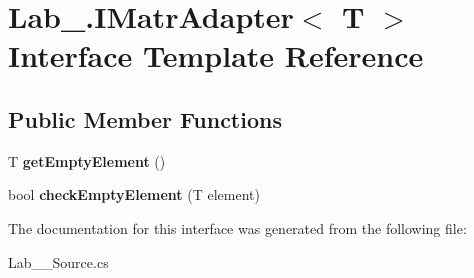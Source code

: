 \hypertarget{interface_lab__3_1_1_i_matr_adapter}{}\section{Lab\+\_.\+I\+Matr\+Adapter$<$ T $>$ Interface Template Reference}
\label{interface_lab__3_1_1_i_matr_adapter}
\subsection*{Public Member Functions}
\begin{DoxyCompactItemize}
\item 
\mbox{\label{interface_lab__3_1_1_i_matr_adapter_a9ebf65e14c3ab701aff51dce8182d47a}} 
T {\bfseries get\+Empty\+Element} ()
\item 
\mbox{\label{interface_lab__3_1_1_i_matr_adapter_ab97cbc19e1eddfddf2224640f7dd8513}} 
bool {\bfseries check\+Empty\+Element} (T element)
\end{DoxyCompactItemize}


The documentation for this interface was generated from the following file\+:\begin{DoxyCompactItemize}
\item 
Lab\+\_\+\_\+\+Source.\+cs\end{DoxyCompactItemize}
